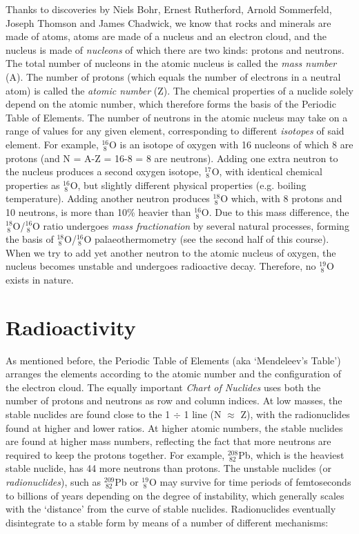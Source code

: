 \documentclass{book}
\begin{document}
Thanks to discoveries by Niels Bohr, Ernest Rutherford, Arnold
Sommerfeld, Joseph Thomson and James Chadwick, we know that rocks and
minerals are made of atoms, atoms are made of a nucleus and an
electron cloud, and the nucleus is made of \emph{nucleons} of which
there are two kinds: protons and neutrons. The total number of
nucleons in the atomic nucleus is called the \emph{mass number}
(A). The number of protons (which equals the number of electrons in a
neutral atom) is called the \emph{atomic number} (Z). The chemical
properties of a nuclide solely depend on the atomic number, which
therefore forms the basis of the Periodic Table of Elements. The
number of neutrons in the atomic nucleus may take on a range of values
for any given element, corresponding to different \emph{isotopes} of
said element. For example, $^{16}_{~8}$O is an isotope of oxygen with
16 nucleons of which 8 are protons (and N = A-Z = 16-8 = 8 are
neutrons). Adding one extra neutron to the nucleus produces a second
oxygen isotope, $^{17}_{~8}$O, with identical chemical properties as
$^{16}_{~8}$O, but slightly different physical properties
(e.g. boiling temperature).  Adding another neutron produces
$^{18}_{~8}$O which, with 8 protons and 10 neutrons, is more than 10\%
heavier than $^{16}_{~8}$O. Due to this mass difference, the
$^{18}_{~8}$O/$^{16}_{~8}$O ratio undergoes \emph{mass fractionation}
by several natural processes, forming the basis of
$^{18}_{~8}$O/$^{16}_{~8}$O palaeothermometry (see the second half of
this course). When we try to add yet another neutron to the atomic
nucleus of oxygen, the nucleus becomes unstable and undergoes
radioactive decay.  Therefore, no $^{19}_{~8}$O exists in nature.

\section{Radioactivity}
\label{sec:radioactivity}

As mentioned before, the Periodic Table of Elements (aka
`Men\-de\-le\-ev's Table') arranges the elements according to the
atomic number and the configuration of the electron cloud. The equally
important \emph{Chart of Nuclides} uses both the number of protons and
neutrons as row and column indices. At low masses, the stable nuclides
are found close to the 1 $\div$ 1 line (N $\approx$ Z), with the
radionuclides found at higher and lower ratios. At higher atomic
numbers, the stable nuclides are found at higher mass numbers,
reflecting the fact that more neutrons are required to keep the
protons together. For example, $^{208}_{~82}$Pb, which is the heaviest
stable nuclide, has 44 more neutrons than protons. The unstable
nuclides (or \emph{radionuclides}), such as $^{209}_{~82}$Pb or
$^{19}_{~8}$O may survive for time periods of femtoseconds to billions
of years depending on the degree of instability, which generally
scales with the `distance' from the curve of stable
nuclides. Radionuclides eventually disintegrate to a stable form by
means of a number of different mechanisms:
\end{document}
